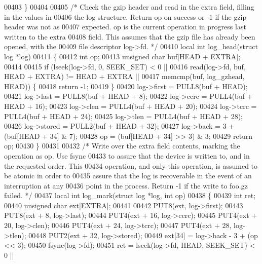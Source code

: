 \begin{DoxyCode}
00403 \}
00404 
00405 \textcolor{comment}{/* Check the gzip header and read in the extra field, filling in the values in}
00406 \textcolor{comment}{   the log structure.  Return op on success or -1 if the gzip header was not as}
00407 \textcolor{comment}{   expected.  op is the current operation in progress last written to the extra}
00408 \textcolor{comment}{   field.  This assumes that the gzip file has already been opened, with the}
00409 \textcolor{comment}{   file descriptor log->fd. */}
00410 local \textcolor{keywordtype}{int} log\_head(\textcolor{keyword}{struct} log *log)
00411 \{
00412     \textcolor{keywordtype}{int} op;
00413     \textcolor{keywordtype}{unsigned} \textcolor{keywordtype}{char} buf[HEAD + EXTRA];
00414 
00415     \textcolor{keywordflow}{if} (lseek(log->fd, 0, SEEK\_SET) < 0 ||
00416         read(log->fd, buf, HEAD + EXTRA) != HEAD + EXTRA ||
00417         memcmp(buf, log\_gzhead, HEAD)) \{
00418         \textcolor{keywordflow}{return} -1;
00419     \}
00420     log->first = PULL8(buf + HEAD);
00421     log->last = PULL8(buf + HEAD + 8);
00422     log->ccrc = PULL4(buf + HEAD + 16);
00423     log->clen = PULL4(buf + HEAD + 20);
00424     log->tcrc = PULL4(buf + HEAD + 24);
00425     log->tlen = PULL4(buf + HEAD + 28);
00426     log->stored = PULL2(buf + HEAD + 32);
00427     log->back = 3 + (buf[HEAD + 34] & 7);
00428     op = (buf[HEAD + 34] >> 3) & 3;
00429     \textcolor{keywordflow}{return} op;
00430 \}
00431 
00432 \textcolor{comment}{/* Write over the extra field contents, marking the operation as op.  Use fsync}
00433 \textcolor{comment}{   to assure that the device is written to, and in the requested order.  This}
00434 \textcolor{comment}{   operation, and only this operation, is assumed to be atomic in order to}
00435 \textcolor{comment}{   assure that the log is recoverable in the event of an interruption at any}
00436 \textcolor{comment}{   point in the process.  Return -1 if the write to foo.gz failed. */}
00437 local \textcolor{keywordtype}{int} log\_mark(\textcolor{keyword}{struct} log *log, \textcolor{keywordtype}{int} op)
00438 \{
00439     \textcolor{keywordtype}{int} ret;
00440     \textcolor{keywordtype}{unsigned} \textcolor{keywordtype}{char} ext[EXTRA];
00441 
00442     PUT8(ext, log->first);
00443     PUT8(ext + 8, log->last);
00444     PUT4(ext + 16, log->ccrc);
00445     PUT4(ext + 20, log->clen);
00446     PUT4(ext + 24, log->tcrc);
00447     PUT4(ext + 28, log->tlen);
00448     PUT2(ext + 32, log->stored);
00449     ext[34] = log->back - 3 + (op << 3);
00450     fsync(log->fd);
00451     ret = lseek(log->fd, HEAD, SEEK\_SET) < 0 ||

\end{DoxyCode}
